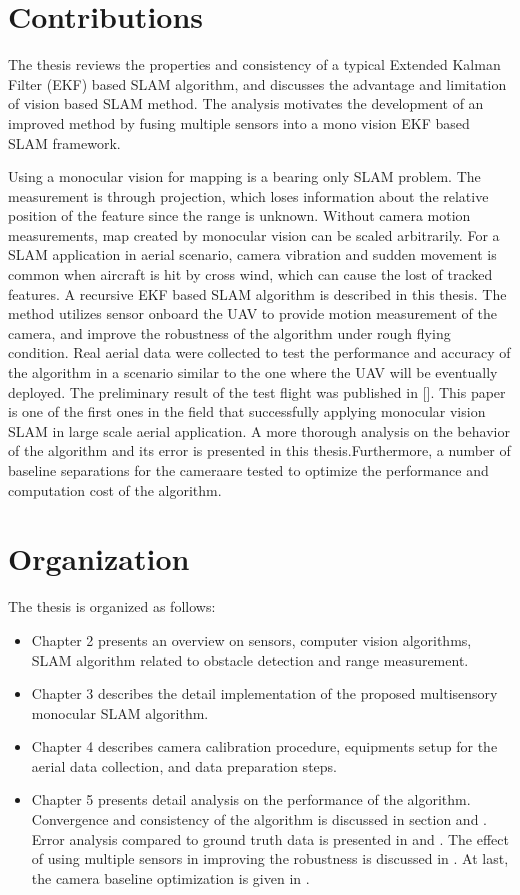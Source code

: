 \section{Contributions}\label{section:Contribution}
The thesis reviews the properties and consistency of a typical Extended 
Kalman Filter (EKF) based SLAM algorithm, and discusses the advantage 
and limitation of vision based SLAM method. The analysis motivates the 
development of an improved method by fusing multiple sensors into a mono 
vision EKF based SLAM framework.

Using a monocular vision for mapping is a bearing only SLAM problem. The 
measurement is through projection, which loses information about the 
relative position of the feature since the range is unknown. Without 
camera motion measurements, map created by monocular vision can be 
scaled arbitrarily. For a SLAM application in aerial scenario, camera 
vibration and sudden movement is common when aircraft is hit by cross 
wind, which can cause the lost of tracked features. A recursive EKF 
based SLAM algorithm is described in this thesis. The method utilizes 
sensor onboard the UAV to provide motion measurement of the camera, and 
improve the robustness of the algorithm under rough flying condition. 
Real aerial data were collected to test the performance and accuracy of 
the algorithm in a scenario similar to the one where the UAV will be 
eventually deployed. The preliminary result of the test flight was 
published in []. This paper is one of the first ones in the field 
that successfully applying monocular vision SLAM in large scale aerial 
application. A more thorough analysis on the behavior of the algorithm 
and its error is presented in this thesis.Furthermore, a number of 
baseline separations for the cameraare tested to optimize the 
performance and computation cost of the algorithm. 

\section{Organization}\label{section:Organization}
The thesis is organized as follows:

\begin{itemize}
\item Chapter 2 presents an overview on sensors, computer vision 
algorithms, SLAM algorithm related to obstacle detection and range 
measurement.
\item Chapter 3 describes the detail implementation of the proposed 
multisensory monocular SLAM algorithm.
\item Chapter 4 describes camera calibration procedure, equipments setup 
for the aerial data collection, and data preparation steps. 
\item Chapter 5 presents detail analysis on the performance of the 
algorithm. Convergence and consistency of the algorithm is discussed in 
section and . Error analysis compared to ground truth data is presented 
in and . The effect of using multiple sensors in improving the 
robustness is discussed in . At last, the camera baseline optimization 
is given in .
\end{itemize}


